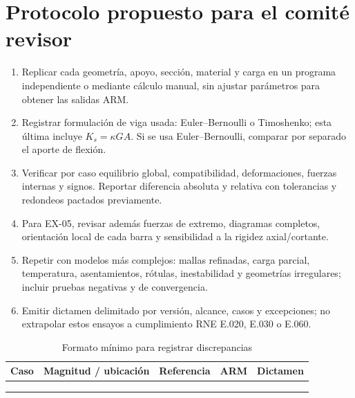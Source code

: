 \documentclass[11pt,a4paper]{article}
\begin{document}
\section{Protocolo propuesto para el comité revisor}
\begin{enumerate}
\item Replicar cada geometría, apoyo, sección, material y carga en un
programa independiente o mediante cálculo manual, sin ajustar parámetros
para obtener las salidas ARM.
\item Registrar formulación de viga usada: Euler--Bernoulli o
Timoshenko; esta última incluye $K_s=\kappa GA$. Si se usa
Euler--Bernoulli, comparar por separado el aporte de flexión.
\item Verificar por caso equilibrio global, compatibilidad, deformaciones,
fuerzas internas y signos. Reportar diferencia absoluta y relativa con
tolerancias y redondeos pactados previamente.
\item Para EX-05, revisar además fuerzas de extremo, diagramas completos,
orientación local de cada barra y sensibilidad a la rigidez axial/cortante.
\item Repetir con modelos más complejos: mallas refinadas, carga parcial,
temperatura, asentamientos, rótulas, inestabilidad y geometrías irregulares;
incluir pruebas negativas y de convergencia.
\item Emitir dictamen delimitado por versión, alcance, casos y excepciones;
no extrapolar estos ensayos a cumplimiento RNE E.020, E.030 o E.060.
\end{enumerate}

\begin{table}[H]\centering
\caption{Formato mínimo para registrar discrepancias}
\begin{tabularx}{\textwidth}{@{}lXlll@{}}\toprule
Caso & Magnitud / ubicación & Referencia & ARM & Dictamen\\\midrule
\rule{0pt}{8mm}\phantom{EX-00} & & & & \\
\rule{0pt}{8mm} & & & & \\
\rule{0pt}{8mm} & & & & \\
\bottomrule\end{tabularx}
\end{table}
\end{document}
